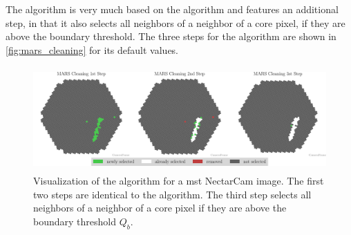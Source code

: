 The \mars{} algorithm \cite{mars} is very much based on the \tailcuts{}
algorithm and features an additional step, in that it also selects all neighbors of a neighbor of a
core pixel, if they are above the boundary threshold. The three steps for the \mars{} algorithm
are shown in \autoref{fig:mars_cleaning} for its default values.

\begin{figure}
    \centering
    \includegraphics[height=4cm]{plots/cleaner_steps/mars.pdf}
    \caption{Visualization of the \mars{} algorithm for a \gls{mst} NectarCam image. The first two
    steps are identical to the \tailcuts{} algorithm. The third step selects all neighbors of a neighbor of a
    core pixel if they are above the boundary threshold \(Q_b\).}
    \label{fig:mars_cleaning}
\end{figure}

